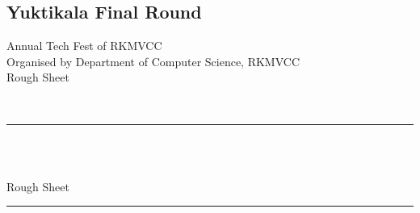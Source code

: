 \documentclass{article}
\title{\titlefont{Nirdesh 2024\vspace{-5.5ex}}}
\date{}
\begin{document}
\maketitle
\thispagestyle{fancy}
\begin{center}
\section*{Yuktikala Final Round}
\end{center}
\begin{center}
\begin{large}
Annual Tech Fest of RKMVCC\\
\vspace{2mm}
Organised by Department of Computer Science, RKMVCC\\
\vspace{2mm}
Rough Sheet
\vspace{2mm}
\end{large}\\
\hrule
\vspace{7mm}
\vspace{1mm}\\
\vspace{1mm}\\
\vspace{0.01mm}
\end{center}
\newpage
Rough Sheet\\
\hrule
\thispagestyle{fancy}
\end{document}
